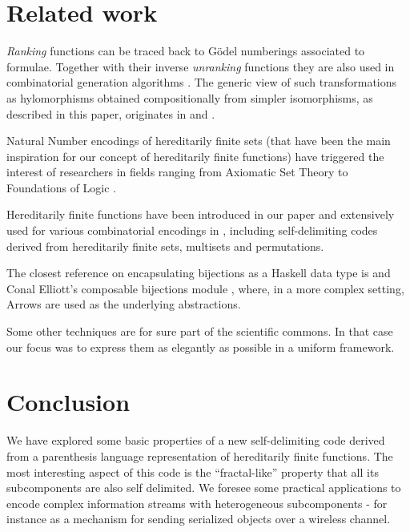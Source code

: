 \documentclass[]{INCLUDES/llncs}
\begin{document}
\section{Related work} \label{related}
{\em Ranking} functions can be traced back to G\"{o}del numberings
\cite{Goedel:31,conf/icalp/HartmanisB74} associated to formulae. 
Together with their inverse {\em unranking} functions they are also 
used in combinatorial generation
algorithms
\cite{conf/mfcs/MartinezM03,knuth06draft,Ruskey90generatingbinary,Myrvold01rankingand}.
The generic view of such transformations as hylomorphisms obtained
compositionally from simpler isomorphisms, as described in this paper,
originates in \cite{sac09fISO} and \cite{arxiv:fISO}.

Natural Number encodings of hereditarily finite sets (that have been the main
inspiration for our concept of hereditarily finite functions) have triggered the
interest of researchers in fields ranging from Axiomatic Set Theory to
Foundations of Logic
\cite{finitemath,kaye07,abian78,avigad97,DBLP:journals/mlq/Kirby07}.

Hereditarily finite functions have been introduced in
our paper \cite{sac09fISO} and extensively used for
various combinatorial encodings in \cite{arxiv:fISO},
including self-delimiting codes derived from
hereditarily finite sets, multisets and permutations.

The closest reference on encapsulating bijections
as a Haskell data type is \cite{bijarrows} 
and Conal Elliott's composable
bijections module \cite{bijeliot},
where, in a more complex setting,
Arrows \cite{hughes:arrows} are used 
as the underlying abstractions.

Some other techniques are
for sure part of the scientific commons. 
In that
case our focus was to express them as
elegantly as possible in a uniform framework.

\section{Conclusion} \label{concl}
We have explored some basic properties of a new self-delimiting code derived
from a parenthesis language representation of hereditarily finite functions.
The most interesting aspect of this code is the ``fractal-like'' property that
all its subcomponents are also self delimited. We foresee some practical
applications to encode complex information streams with
heterogeneous subcomponents - for instance as a mechanism for
sending serialized objects over a wireless channel.
\end{document}
